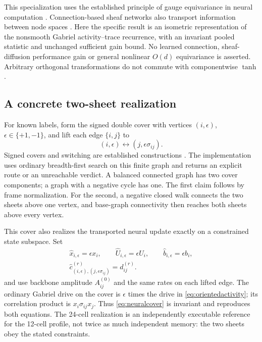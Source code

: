 \documentclass[11pt,a4paper]{article}
\theoremstyle{definition}\newtheorem{definition}[theorem]{Definition}
\begin{document}
This specialization uses the established principle of gauge equivariance in neural computation \cite{cohen2019gauge}. Connection-based sheaf networks also transport information between node spaces \cite{barbero2022}. Here the specific result is an isometric representation of the nonsmooth Gabriel activity--trace recurrence, with an invariant pooled statistic and unchanged sufficient gain bound. No learned connection, sheaf-diffusion performance gain or general nonlinear $O(d)$ equivariance is asserted. Arbitrary orthogonal transformations do not commute with componentwise $\tanh$.

\subsection{A concrete two-sheet realization}
For known labels, form the signed double cover with vertices $(i,\epsilon)$, $\epsilon\in\{+1,-1\}$, and lift each edge $\{i,j\}$ to
\begin{equation}
 (i,\epsilon)\longleftrightarrow(j,\epsilon\sigma_{ij}).
 \label{eq:doublecover}
\end{equation}
Signed covers and switching are established constructions \cite{zaslavsky1982}. The implementation uses ordinary breadth-first search on this finite graph and returns an explicit route or an unreachable verdict. A balanced connected graph has two cover components; a graph with a negative cycle has one. The first claim follows by frame normalization. For the second, a negative closed walk connects the two sheets above one vertex, and base-graph connectivity then reaches both sheets above every vertex.

This cover also realizes the transported neural update exactly on a constrained state subspace. Set
\begin{equation}
 \begin{gathered}
 \widehat x_{i,\epsilon}=\epsilon x_i,\qquad
 \widehat U_{i,\epsilon}=\epsilon U_i,\qquad
 \widehat b_{i,\epsilon}=\epsilon b_i,\\
 \widehat c^{(r)}_{(i,\epsilon),(j,\epsilon\sigma_{ij})}=d^{(r)}_{ij}.
 \end{gathered}
 \label{eq:neuralcover}
\end{equation}
and use backbone amplitude $A^{(0)}_{ij}$ and the same rates on each lifted edge. The ordinary Gabriel drive on the cover is $\epsilon$ times the drive in \eqref{eq:orientedactivity}; its correlation product is $x_i\sigma_{ij}x_j$. Thus \eqref{eq:neuralcover} is invariant and reproduces both equations. The 24-cell realization is an independently executable reference for the 12-cell profile, not twice as much independent memory: the two sheets obey the stated constraints.
\end{document}
